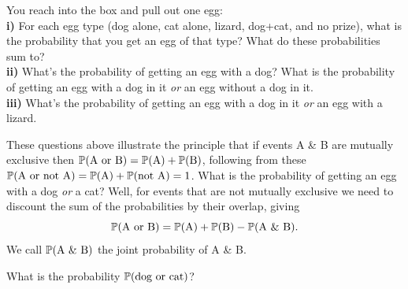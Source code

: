 \begin{question}{}
You reach into the box and pull out one egg:\\
{\bf i)} For each egg type (dog alone, cat alone, lizard, dog+cat, and no prize),
what is the probability that you get an egg of that type? What do these probabilities sum to?\\
{\bf ii)} What's the probability of getting an egg with a dog? What is
the probability of getting an egg with a dog in it {\it or} an egg without a dog in it. \\
{\bf iii)} What's the probability of getting an egg with a dog in it {\it or} an egg with a lizard. \\
\end{question}
These questions above illustrate the principle that if events A \& B
are mutually exclusive then $\P(\textrm{A or B}) = \P(\textrm{A}) + \P(\textrm{B})$,
following from these $\P(\textrm{A or not A}) = \P(\textrm{A}) + \P(\textrm{not A}) =
1$. What is the probability of getting an egg with a dog {\it or} a
cat?  Well, for events that are not mutually exclusive we need to
discount the sum of the probabilities by their overlap, giving
\begin{equation}
\P(\textrm{A or B}) = \P(\textrm{A}) +\P(\textrm{B}) - \P(\textrm{A \& B}).
\end{equation}
We call $ \P(\textrm{A \& B}) $ the joint probability of A \& B.
\begin{question}{}
What is the probability $\P(\textrm{dog or cat})$?
\end{question}


